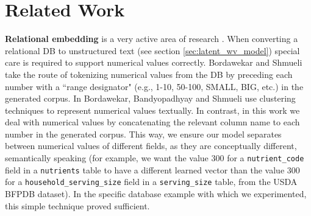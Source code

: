 \section{Related Work}
\textbf{Relational embedding} is a very active area of research \cite{DBLP:journals/corr/abs-1803-01384, sigmod2020_keynote, pie2020_keynote}.
When converting a relational DB to unstructured text (see section \ref{sec:latent_wv_model}) special care is required to support numerical values correctly. Bordawekar and Shmueli \cite{DBLP:journals/corr/BordawekarS16} take the route of tokenizing numerical values from the DB by preceding each number with a ``range designator" (e.g., 1-10, 50-100, SMALL, BIG, etc.) in the generated corpus. In \cite{DBLP:journals/corr/abs-1712-07199} Bordawekar, Bandyopadhyay and Shmueli use clustering techniques to represent numerical values textually. In contrast, in this work we deal with numerical values by concatenating the relevant column name to each number in the generated corpus. This way, we ensure our model separates between numerical values of different fields, as they are conceptually different, semantically speaking (for example, we want the value 300 for a \texttt{nutrient\_code} field in a \texttt{nutrients} table to have a different learned vector than the value 300 for a \texttt{household\_serving\_size} field in a \texttt{serving\_size} table, from the USDA BFPDB \cite{usda_bfpd-dataset} dataset). In the specific database example with which we experimented, this simple technique proved sufficient.



